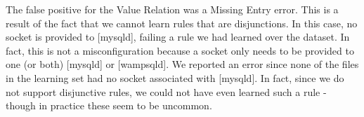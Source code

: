 The false positive for the Value Relation was a Missing Entry error.
This is a result of the fact that we cannot learn rules that are disjunctions.
In this case, no socket is provided to [mysqld], failing a rule we had learned over the dataset.
In fact, this is not a misconfiguration because a socket only needs to be provided to one (or both) [mysqld] or [wampsqld].
We reported an error since none of the files in the learning set had no socket associated with [mysqld].
In fact, since we do not support disjunctive rules, we could not have even learned such a rule - though in practice these seem to be uncommon.

